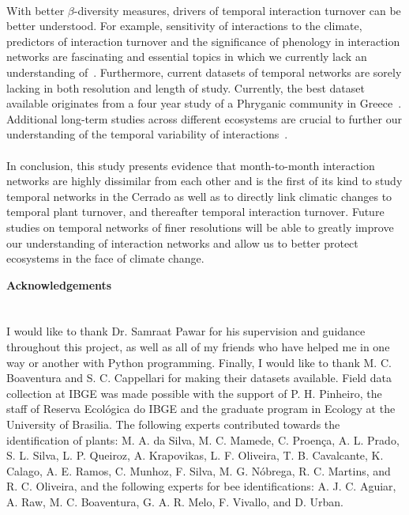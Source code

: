 \documentclass[11pt]{article}
\begin{document}
\\
With better $\beta$-diversity measures, drivers of temporal interaction turnover can be better understood. For example, sensitivity of interactions to the climate, predictors of interaction turnover and the significance of phenology in interaction networks are fascinating and essential topics in which we currently lack an understanding of~\citep{Poisot2012}. Furthermore, current datasets of temporal networks are sorely lacking in both resolution and length of study. Currently, the best dataset available originates from a four year study of a Phryganic community in Greece~\citep{Petanidou1991}. 
Additional long-term studies across different ecosystems are crucial to further our understanding of the temporal variability of interactions~\citep{Burkle2011}.\\
\\
In conclusion, this study presents evidence that month-to-month interaction networks are highly dissimilar from each other and is the first of its kind to study temporal networks in the Cerrado as well as to directly link climatic changes to temporal plant turnover, and thereafter temporal interaction turnover. Future studies on temporal networks of finer resolutions will be able to greatly improve our understanding of interaction networks and allow us to better protect ecosystems in the face of climate change.

\newpage 
\vspace*{\fill}

{\huge\bfseries Acknowledgements} \label{sec: acknowledgements} \\
\\
\\
\large{I would like to thank Dr. Samraat Pawar for his supervision and guidance throughout this project, as well as  all of my friends who have helped me in one way or another with Python programming. Finally, I would like to thank M. C. Boaventura and S. C. Cappellari for making their datasets available. Field data collection at IBGE was made possible with the support of P. H. Pinheiro, the staff of Reserva Ecol\'{o}gica do IBGE and the graduate program in Ecology at the University of Brasilia. The following experts contributed towards the identification of plants: M. A. da Silva, M. C. Mamede, C. Proen\c{c}a, A. L. Prado, S. L. Silva, L. P. Queiroz, A. Krapovikas, L. F. Oliveira, T. B. Cavalcante, K. Calago, A. E. Ramos, C. Munhoz, F. Silva, M. G. N\'{o}brega, R. C. Martins, and R. C. Oliveira, and the following experts for bee identifications: A. J. C. Aguiar, A. Raw, M. C. Boaventura, G. A. R. Melo, F. Vivallo, and D. Urban.}
\vfill
\end{document}

